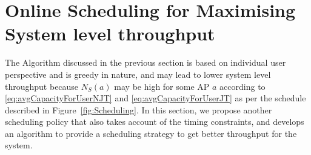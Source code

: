 

\section{Online Scheduling for Maximising System level throughput}
\label{sec:optimal_scheduling}

The Algorithm discussed in the previous section is based on individual user perspective and is greedy in nature, and may lead to lower system level throughput because $N_S(a)$ may be high for some AP $a$ according to \eqref{eq:avgCapacityForUserNJT} and \eqref{eq:avgCapacityForUserJT} as per the schedule described in Figure~\ref{fig:Scheduling}.
In this section, we propose another scheduling policy that also takes account of the timing constraints, and develops an algorithm to provide a scheduling strategy to get better throughput for the system.







